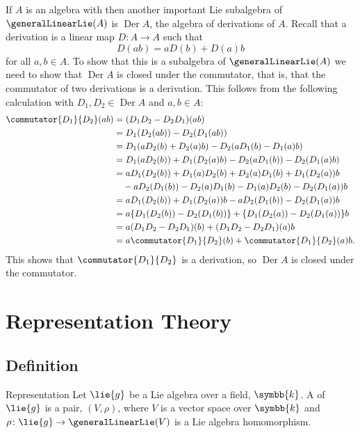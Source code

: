 \documentclass[fleqn]{NotesClass}
\renewcommand{\field}{\symbb{k}}
\DeclareMathOperator{\Der}{Der}
\begin{document}
    If \(A\) is an algebra with then another important Lie subalgebra of \(\generalLinearLie(A)\) is \(\Der A\), the algebra of derivations of \(A\).
    Recall that a derivation is a linear map \(D \colon A \to A\) such that
    \begin{equation}
        D(ab) = aD(b) + D(a)b
    \end{equation}
    for all \(a, b \in A\).
    To show that this is a subalgebra of \(\generalLinearLie(A)\) we need to show that \(\Der A\) is closed under the commutator, that is, that the commutator of two derivations is a derivation.
    This follows from the following calculation with \(D_1, D_2 \in \Der A\) and \(a, b \in A\):
    \begingroup
    \allowdisplaybreaks
    \begin{align}
        \commutator{D_1}{D_2}(ab) &= (D_1D_2 - D_2D_1)(ab)\\
        &= D_1(D_2(ab)) - D_2(D_1(ab)) \notag\\
        &= D_1(aD_2(b) + D_2(a)b) - D_2(aD_1(b) - D_1(a)b) \notag\\
        &= D_1(aD_2(b)) + D_1(D_2(a)b) - D_2(aD_1(b)) - D_2(D_1(a)b) \notag\\
        &= aD_1(D_2(b)) + D_1(a)D_2(b) + D_2(a)D_1(b) + D_1(D_2(a))b \notag\\
        &\quad- aD_2(D_1(b)) - D_2(a)D_1(b) - D_1(a)D_2(b) - D_2(D_1(a))b \notag\\
        &= aD_1(D_2(b)) + D_1(D_2(a))b - aD_2(D_1(b)) - D_2(D_1(a))b \notag\\
        &= a\{D_1(D_2(b)) - D_2(D_1(b))\} + \{D_1(D_2(a)) - D_2(D_1(a))\}b \notag\\
        &= a(D_1D_2 - D_2D_1)(b) + (D_1D_2 - D_2D_1)(a)b \notag\\
        &= a\commutator{D_1}{D_2}(b) + \commutator{D_1}{D_2}(a)b. \notag
    \end{align}
    \endgroup
    This shows that \(\commutator{D_1}{D_2}\) is a derivation, so \(\Der A\) is closed under the commutator.
    
    \chapter{Representation Theory}
    \section{Definition}
    \begin{dfn}{Representation}{}
        Let \(\lie{g}\) be a Lie algebra over a field, \(\field\).
        A  of \(\lie{g}\) is a pair, \((V, \rho)\), where \(V\) is a vector space over \(\field\) and \(\rho \colon \lie{g} \to \generalLinearLie(V)\) is a Lie algebra homomorphism.
    \end{dfn}
    
\end{document}
